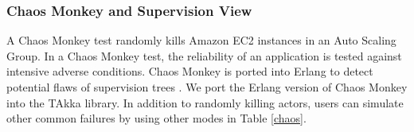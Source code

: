 \subsubsection {Chaos Monkey and Supervision View}

A Chaos Monkey test \cite{ChaosMonkey} randomly kills Amazon EC2 instances in 
an Auto Scaling Group.  In a Chaos Monkey test, the 
reliability of an application is tested against intensive adverse 
conditions.  Chaos Monkey is ported into Erlang to detect potential flaws of 
supervision trees \cite{ErlangChaosMonkey}.  We port the Erlang version of Chaos 
Monkey into the TAkka library.  In addition to randomly killing actors, users 
can simulate other common failures by using other modes in Table \ref{chaos}.



